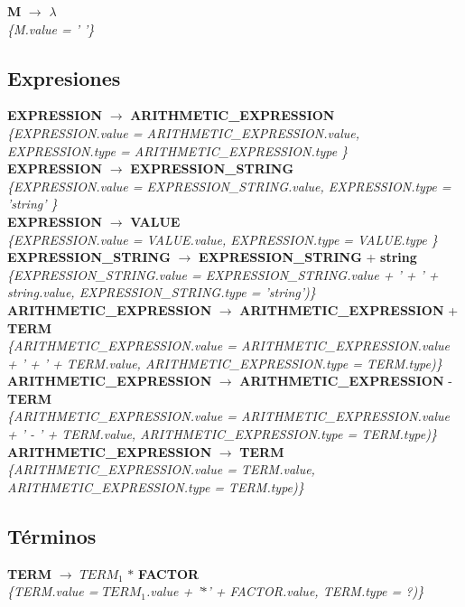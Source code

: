 \documentclass[10pt,a4paper]{article}
\begin{document}
\textbf{M} $\rightarrow$ $\lambda$ \\
\textit{\{M.value = ' '\}} \\

\subsection{Expresiones}
\textbf{EXPRESSION} $\rightarrow$ \textbf{ARITHMETIC\_EXPRESSION} \\   
\textit{\{EXPRESSION.value =  ARITHMETIC\_EXPRESSION.value, EXPRESSION.type = ARITHMETIC\_EXPRESSION.type \}}  \\

\textbf{EXPRESSION} $\rightarrow$ \textbf{EXPRESSION\_STRING} \\
\textit{\{EXPRESSION.value =  EXPRESSION\_STRING.value, EXPRESSION.type = 'string' \}}  \\ 

\textbf{EXPRESSION} $\rightarrow$ \textbf{VALUE} \\
\textit{\{EXPRESSION.value =  VALUE.value, EXPRESSION.type = VALUE.type \}} \\

\textbf{EXPRESSION\_STRING} $\rightarrow$ \textbf{EXPRESSION\_STRING} + \textbf{string} \\ \textit{\{EXPRESSION\_STRING.value =  EXPRESSION\_STRING.value + ' + ' + string.value, EXPRESSION\_STRING.type = 'string')\}} \\

\textbf{ARITHMETIC\_EXPRESSION} $\rightarrow$ \textbf{ARITHMETIC\_EXPRESSION} + \textbf{TERM} \\
\textit{\{ARITHMETIC\_EXPRESSION.value =  ARITHMETIC\_EXPRESSION.value + ' + ' + TERM.value, ARITHMETIC\_EXPRESSION.type = TERM.type)\}} \\

\textbf{ARITHMETIC\_EXPRESSION} $\rightarrow$ \textbf{ARITHMETIC\_EXPRESSION} - \textbf{TERM}  \\
\textit{\{ARITHMETIC\_EXPRESSION.value =  ARITHMETIC\_EXPRESSION.value + ' - ' + TERM.value, ARITHMETIC\_EXPRESSION.type = TERM.type)\}} \\

\textbf{ARITHMETIC\_EXPRESSION} $\rightarrow$ \textbf{TERM} \\
\textit{\{ARITHMETIC\_EXPRESSION.value = TERM.value, ARITHMETIC\_EXPRESSION.type = TERM.type)\}}  \\

\subsection{Términos}
\textbf{TERM} $\rightarrow$ \textbf{$TERM_{1}$} $*$ \textbf{FACTOR}   \\
\textit{\{TERM.value = $TERM_{1}$.value + '$*$' + FACTOR.value, TERM.type = ?)\}} \\
\end{document}
